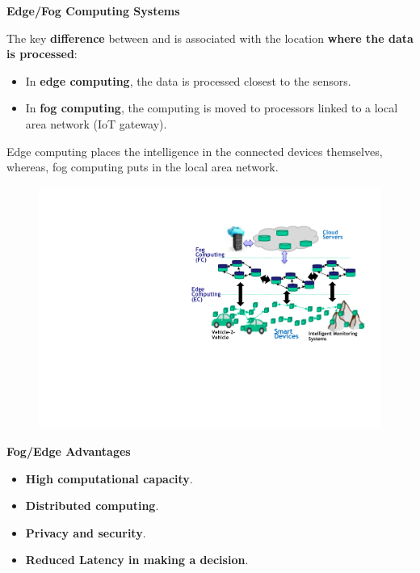\newpage

\begin{center}
    \large
    \textcolor{Red3}{\textbf{Edge/Fog Computing Systems}}
\end{center}

\noindent
The key \textbf{difference} between  and  is associated with the location \textbf{where the data is processed}:
\begin{itemize}
    \item In \textbf{edge computing}, the data is processed closest to the sensors.

    \item In \textbf{fog computing}, the computing is moved to processors linked to a local area network (IoT gateway).
\end{itemize}
Edge computing places the intelligence in the connected devices themselves, whereas, fog computing puts in the local area network.

\begin{figure}[!htp]
    \centering
    \includegraphics[width=.8\textwidth]{img/edge-fog-computing-systems-1.pdf}
\end{figure}

\begin{flushleft}
    \textcolor{Green3}{ \textbf{Fog/Edge Advantages}}
\end{flushleft}
\begin{itemize}
    \item \textbf{High computational capacity}.
    \item \textbf{Distributed computing}.
    \item \textbf{Privacy and security}.
    \item \textbf{Reduced Latency in making a decision}.
\end{itemize}

